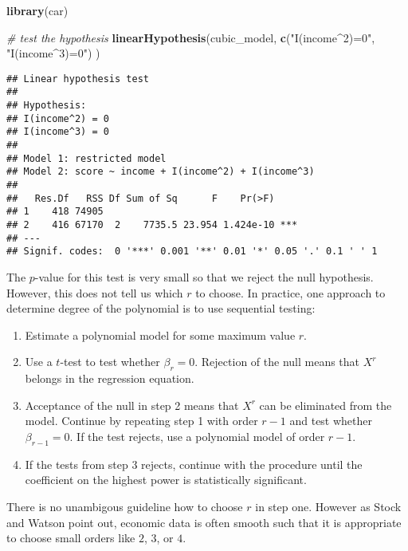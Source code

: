 \documentclass[]{book}
\newenvironment{Shaded}{\begin{snugshade}}{\end{snugshade}}
\newcommand{\KeywordTok}[1]{\textcolor[rgb]{0.13,0.29,0.53}{\textbf{#1}}}
\newcommand{\StringTok}[1]{\textcolor[rgb]{0.31,0.60,0.02}{#1}}
\newcommand{\CommentTok}[1]{\textcolor[rgb]{0.56,0.35,0.01}{\textit{#1}}}
\newcommand{\NormalTok}[1]{#1}
\providecommand{\tightlist}{%
  \setlength{\itemsep}{0pt}\setlength{\parskip}{0pt}}
\theoremstyle{definition}
\theoremstyle{definition}
\theoremstyle{definition}
\theoremstyle{remark}
\begin{document}
\begin{Shaded}
\begin{Highlighting}[]
\KeywordTok{library}\NormalTok{(car)}

\CommentTok{# test the hypothesis}
\KeywordTok{linearHypothesis}\NormalTok{(cubic_model, }
                 \KeywordTok{c}\NormalTok{(}\StringTok{"I(income^2)=0"}\NormalTok{, }\StringTok{"I(income^3)=0"}\NormalTok{)}
\NormalTok{)}
\end{Highlighting}
\end{Shaded}

\begin{verbatim}
## Linear hypothesis test
## 
## Hypothesis:
## I(income^2) = 0
## I(income^3) = 0
## 
## Model 1: restricted model
## Model 2: score ~ income + I(income^2) + I(income^3)
## 
##   Res.Df   RSS Df Sum of Sq      F    Pr(>F)    
## 1    418 74905                                  
## 2    416 67170  2    7735.5 23.954 1.424e-10 ***
## ---
## Signif. codes:  0 '***' 0.001 '**' 0.01 '*' 0.05 '.' 0.1 ' ' 1
\end{verbatim}

The \(p\)-value for this test is very small so that we reject the null
hypothesis. However, this does not tell us which \(r\) to choose. In
practice, one approach to determine degree of the polynomial is to use
sequential testing:

\begin{enumerate}
\def\labelenumi{\arabic{enumi}.}
\tightlist
\item
  Estimate a polynomial model for some maximum value \(r\).
\item
  Use a \(t\)-test to test whether \(\beta_r = 0\). Rejection of the
  null means that \(X^r\) belongs in the regression equation.
\item
  Acceptance of the null in step 2 means that \(X^r\) can be eliminated
  from the model. Continue by repeating step 1 with order \(r-1\) and
  test whether \(\beta_{r-1}=0\). If the test rejects, use a polynomial
  model of order \(r-1\).
\item
  If the tests from step 3 rejects, continue with the procedure until
  the coefficient on the highest power is statistically significant.
\end{enumerate}

There is no unambigous guideline how to choose \(r\) in step one.
However as Stock and Watson point out, economic data is often smooth
such that it is appropriate to choose small orders like \(2\), \(3\), or
\(4\).
\end{document}
